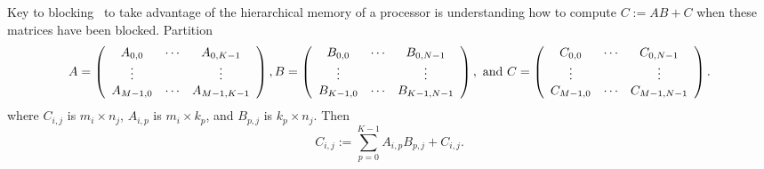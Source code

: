 Key to blocking \Gemm\ to take advantage of the hierarchical memory of
a processor is understanding how to compute $ C := A B + C $ when
these matrices have been blocked.  Partition
{\footnotesize%
\[
A = 
\left( \begin{array}{c c c c}
A_{0,0} & \cdots & A_{0,K-1} \\
\vdots &  & \vdots \\
A_{M-1,0} & \cdots & A_{M-1,K-1} \\
\end{array}
\right),
B = 
\left( \begin{array}{c c c c}
B_{0,0} & \cdots & B_{0,N-1} \\
\vdots &  & \vdots \\
B_{K-1,0} & \cdots & B_{K-1,N-1} \\
\end{array}
\right), \mbox{~and~}
C = 
\left( \begin{array}{c c c c}
C_{0,0} & \cdots & C_{0,N-1} \\
\vdots &  & \vdots \\
C_{M-1,0} & \cdots & C_{M-1,N-1} \\
\end{array}
\right).
\]%
}
where $ C_{i,j} $ is $ m_i \times n_j
$, $ A_{i,p} $ is $ m_i \times k_p
$, and $ B_{p,j} $ is $ k_p \times n_j
$.
Then
\[
C_{i,j} := \sum_{p=0}^{K-1} A_{i,p} B_{p,j} + C_{i,j}.
\]
